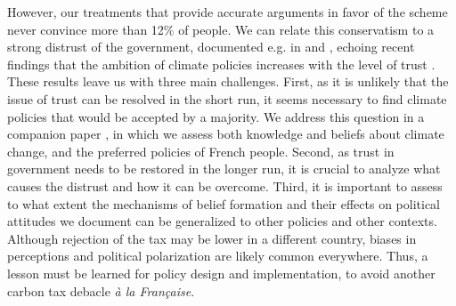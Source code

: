 \documentclass[12pt]{article} %
\begin{document}
However, our treatments that provide accurate arguments in favor of the scheme never convince more than 12\% of people. We can relate this conservatism to a strong distrust of the government, documented e.g. in \citet{alesina_intergenerational_2018} and \citet{algan_et_al_19}, echoing recent findings that the ambition of climate policies increases with the level of trust \citep{rafaty_perceptions_2018}. These results leave us with three main challenges. First, as it is unlikely that the issue of trust can be resolved in the short run, it seems necessary to find climate policies that would be accepted by a majority. We address this question in a companion paper \citep{douenne_french_2019}, in which we assess both knowledge and beliefs about climate change, and the preferred policies of French people. Second, as trust in government needs to be restored in the longer run, it is crucial to analyze what causes the distrust and how it can be overcome. Third, it is important to assess to what extent the mechanisms of belief formation and their effects on political attitudes we document can be generalized to other policies and other contexts. Although rejection of the tax may be lower in a different country, biases in perceptions and political polarization are likely common everywhere. Thus, a lesson must be learned for policy design and implementation, to avoid another carbon tax debacle \textit{à la Française}.


\end{document}
